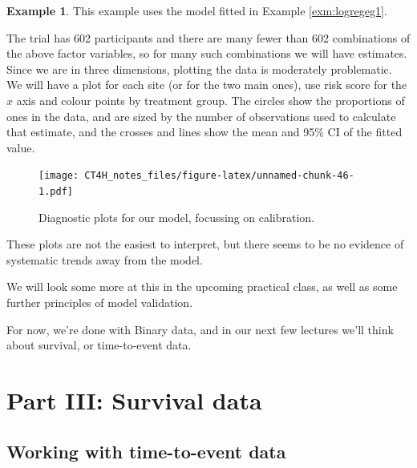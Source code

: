 \documentclass[
  openany]{book}
\theoremstyle{definition}
\theoremstyle{definition}
\newtheorem{example}{Example}[chapter]
\theoremstyle{definition}
\theoremstyle{definition}
\theoremstyle{remark}
\begin{document}
\begin{example}
This example uses the model fitted in Example \ref{exm:logregeg1}.

The trial has 602 participants and there are many fewer than 602 combinations of the above factor variables, so for many such combinations we will have estimates. Since we are in three dimensions, plotting the data is moderately problematic. We will have a plot for each site (or for the two main ones), use risk score for the \(x\) axis and colour points by treatment group. The circles show the proportions of ones in the data, and are sized by the number of observations used to calculate that estimate, and the crosses and lines show the mean and 95\% CI of the fitted value.

\begin{figure}
\centering
\texttt{[image: CT4H\_notes\_files/figure-latex/unnamed-chunk-46-1.pdf]}
\caption{\label{fig:unnamed-chunk-46}Diagnostic plots for our model, focussing on calibration.}
\end{figure}

These plots are not the easiest to interpret, but there seems to be no evidence of systematic trends away from the model.
\end{example}

We will look some more at this in the upcoming practical class, as well as some further principles of model validation.

For now, we're done with Binary data, and in our next few lectures we'll think about survival, or time-to-event data.

\hypertarget{part-part-iii-survival-data}{%
\part{Part III: Survival data}\label{part-part-iii-survival-data}}

\hypertarget{working-with-time-to-event-data}{%
\chapter{Working with time-to-event data}\label{working-with-time-to-event-data}}
\end{document}
